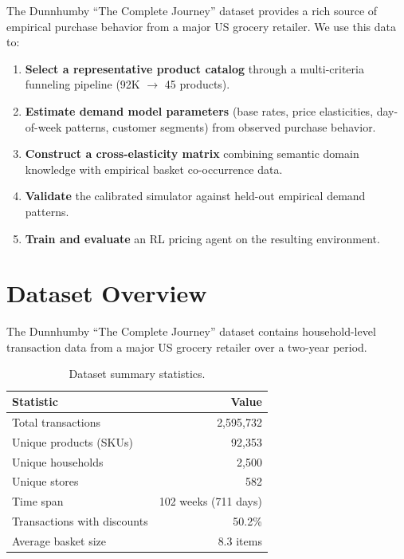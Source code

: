 \documentclass[11pt,a4paper]{article}
\begin{document}
The Dunnhumby ``The Complete Journey'' dataset provides a rich source of empirical purchase behavior from a major US grocery retailer.
We use this data to:
\begin{enumerate}[label=(\roman*)]
    \item \textbf{Select a representative product catalog} through a multi-criteria funneling pipeline (92K $\to$ 45 products).
    \item \textbf{Estimate demand model parameters} (base rates, price elasticities, day-of-week patterns, customer segments) from observed purchase behavior.
    \item \textbf{Construct a cross-elasticity matrix} combining semantic domain knowledge with empirical basket co-occurrence data.
    \item \textbf{Validate} the calibrated simulator against held-out empirical demand patterns.
    \item \textbf{Train and evaluate} an RL pricing agent on the resulting environment.
\end{enumerate}

\section{Dataset Overview}
\label{sec:dataset}

The Dunnhumby ``The Complete Journey'' dataset contains household-level transaction data from a major US grocery retailer over a two-year period.

\begin{table}[H]
\centering
\caption{Dataset summary statistics.}
\begin{tabular}{@{}lr@{}}
\toprule
\textbf{Statistic} & \textbf{Value} \\
\midrule
Total transactions & 2,595,732 \\
Unique products (SKUs) & 92,353 \\
Unique households & 2,500 \\
Unique stores & 582 \\
Time span & 102 weeks (711 days) \\
Transactions with discounts & 50.2\% \\
Average basket size & 8.3 items \\
\bottomrule
\end{tabular}
\end{table}
\end{document}
